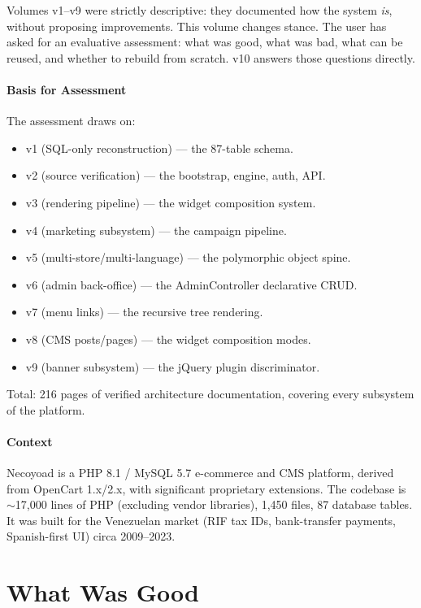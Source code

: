 \documentclass[11pt,a4paper]{article}
\begin{document}
Volumes v1--v9 were strictly descriptive: they documented how the system
\emph{is}, without proposing improvements. This volume changes stance.
The user has asked for an evaluative assessment: what was good, what was
bad, what can be reused, and whether to rebuild from scratch. v10 answers
those questions directly.

\subsection{Basis for Assessment}

The assessment draws on:
\begin{itemize}[leftmargin=1.6em,itemsep=2pt]
  \item v1 (SQL-only reconstruction) --- the 87-table schema.
  \item v2 (source verification) --- the bootstrap, engine, auth, API.
  \item v3 (rendering pipeline) --- the widget composition system.
  \item v4 (marketing subsystem) --- the campaign pipeline.
  \item v5 (multi-store/multi-language) --- the polymorphic object spine.
  \item v6 (admin back-office) --- the AdminController declarative CRUD.
  \item v7 (menu links) --- the recursive tree rendering.
  \item v8 (CMS posts/pages) --- the widget composition modes.
  \item v9 (banner subsystem) --- the jQuery plugin discriminator.
\end{itemize}

Total: 216 pages of verified architecture documentation, covering every
subsystem of the platform.

\subsection{Context}

Necoyoad is a PHP 8.1 / MySQL 5.7 e-commerce and CMS platform, derived
from OpenCart 1.x/2.x, with significant proprietary extensions. The
codebase is $\sim$17,000 lines of PHP (excluding vendor libraries),
1,450 files, 87 database tables. It was built for the Venezuelan market
(RIF tax IDs, bank-transfer payments, Spanish-first UI) circa 2009--2023.

\part{What Was Good}\label{part:good}
\end{document}
